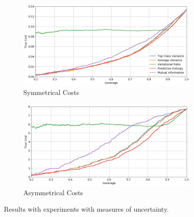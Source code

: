 \begin{figure}[!h]
	\centering
	\begin{subfigure}{\textwidth}
		\centering
		\includegraphics[width=\linewidth]{images/multi-class-uncertainity-sym.png}
		\caption{Symmetrical Costs}	
	\end{subfigure}
	\begin{subfigure}{\textwidth}
		\centering
		\includegraphics[width=\linewidth]{images/multi-class-uncertainity-asym.png}
		\caption{Asymmetrical Costs}
	\end{subfigure}
	\caption{Results with experiments with measures of uncertainty.}
	\label{fig:multi-class-uncertainity}
\end{figure}



